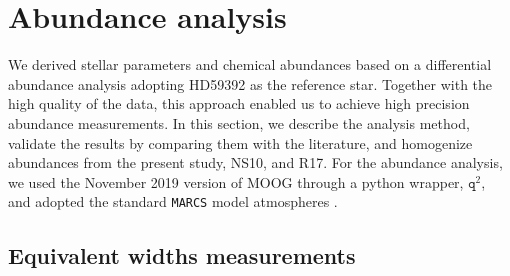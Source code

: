 \documentclass{aa}
\begin{document}
\section{Abundance analysis\label{sec:analysis}}

We derived stellar parameters and chemical abundances based on a differential abundance analysis adopting HD59392 as the reference star.
Together with the high quality of the data, this approach enabled us to achieve high precision abundance measurements.
In this section, we describe the analysis method, validate the results by comparing them with the literature, and homogenize abundances from the present study, NS10, and R17.
For the abundance analysis, we used the November 2019 version of MOOG \citep{Sneden1973} through a python wrapper, $\texttt{q}^2$\citep{Ramirez2014}, and adopted the standard \texttt{MARCS} model atmospheres \citep{Gustafsson2008}. 

\subsection{Equivalent widths measurements}
\end{document}
